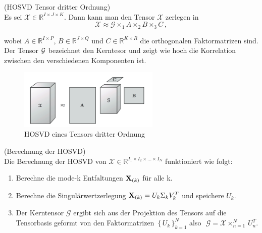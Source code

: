 \begin{Beispiel} (HOSVD Tensor dritter Ordnung) \\
Es sei $\pmb{\mathscr{X}} \in \mathbb{R}^{I \times J \times K}$.  Dann kann man den Tensor $\pmb{\mathscr{X}}$ zerlegen in 
\begin{equation}
{\pmb{\mathscr{X}}} \approx  \pmb{\mathscr{G}}  \times_1 A \times_2 B \times_3 C  \, ,
\end{equation}

wobei $A \in \mathbb{R}^{I \times P}$, $B \in \mathbb{R}^{J \times Q}$ und $C \in \mathbb{R}^{K \times R}$ die orthogonalen Faktormatrizen sind.
Der Tensor ${\cal G}$ bezeichnet den Kerntesor und zeigt wie hoch die Korrelation zwischen den verschiedenen Komponenten ist.

\end{Beispiel}
\begin{figure}[ht]
	\centering
  \includegraphics[width=0.6\textwidth]{hosvdTensor.png}
	\caption{HOSVD eines Tensors dritter Ordnung \cite[475]{Kolda}}
	\label{fig:hosvdTensor}
\end{figure}

\newpage
\begin{framed}
\begin{Bemerkung} (Berechnung der HOSVD) \\ \label{hosvd}
Die Berechnung der HOSVD von ${\pmb{\mathscr{X}}}  \in \mathbb{R}^{I_1 \times I_2 \times \dots \times I_N}$ funktioniert wie folgt:
\begin{enumerate}
\item Berechne die mode-k Entfaltungen $\bold{X}_{(k)}$ für alle k.
\item Berechne die Singulärwertzerlegung $\bold{X}_{(k)}=U_k \Sigma_k V_k^T$ und speichere $U_k$.
\item Der Kerntensor ${\pmb{\mathscr{G}}} $ ergibt sich aus der Projektion des Tensors auf die Tensorbasis geformt von den Faktormatrizen  $ \, \{ \, U_k \, \}_{k=1}^{N}$  also $\, \, {\pmb{\mathscr{G}}} ={\pmb{\mathscr{X}}}  \times_{n=1}^{N} \, U_n^T$.
\end{enumerate}
\end{Bemerkung}
\end{framed}

